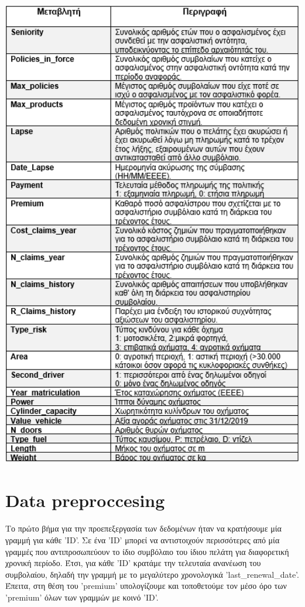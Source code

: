 \documentclass{llncs}
\begin{document}
\begin{center}
    \includegraphics[width=1\textwidth]{images/variables_2.png}
\end{center}

\newpage
\section{Data preproccesing}
Το πρώτο βήμα για την προεπεξεργασία των δεδομένων ήταν να κρατήσουμε μία γραμμή για κάθε 'ID'. Σε ένα 'ID' μπορεί να αντιστοιχούν  περισσότερες από μία γραμμές που αντιπροσωπεύουν το 
ίδιο συμβόλαιο του ίδιου πελάτη για διαφορετική χρονική περίοδο. Έτσι, για κάθε 'ID' κρατάμε την τελευταία ανανέωση του συμβολαίου, δηλαδή την γραμμή με το μεγαλύτερο χρονολογικά 'last\_renewal\_date'. 
Έπειτα, στη θέση του 'premium' υπολογίζουμε και τοποθετούμε τον μέσο όρο των 'premium' όλων των γραμμών με κοινό 'ID'.
\end{document}
